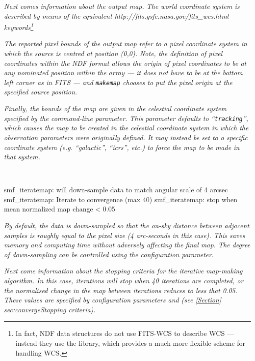 \emph{Next comes information about the output map. The world coordinate
system is described by means of the equivalent 
{http://fits.gsfc.nasa.gov/fits_wcs.html} keywords\footnote{In fact, NDF
data structures do not use FITS-WCS to describe WCS --- instead they use the
 library, which
provides a much more flexible scheme for handling WCS.}}

\emph{The reported pixel bounds of the output map refer to a pixel coordinate
system in which the source is centred at position (0,0). Note, the definition of
pixel coordinates within the NDF format allows the origin of pixel
coordinates to be at any nominated position within the array --- it does
not have to be at the bottom left corner as in FITS --- and \texttt{makemap}
chooses to put the pixel origin at the specified source position. }

\emph{Finally, the bounds of the map are given in the celestial coordinate
system specified by the  command-line
parameter.  This parameter defaults to ``\texttt{tracking}'', which causes
the map to be created in the celestial coordinate system in which the
observation parameters were originally defined. It may instead be set to a
specific coordinate system (e.g. ``galactic'', ``icrs'', etc.) to force the
map to be made in that system.}

~
\begin{terminalv}
smf_iteratemap: will down-sample data to match angular scale of 4 arcsec
smf_iteratemap: Iterate to convergence (max 40)
smf_iteratemap: stop when mean normalized map change < 0.05
\end{terminalv}

\emph{By default, the data is down-sampled so that the on-sky distance between
adjacent samples is roughly equal to the pixel size (4 arc-seconds in
this case). This saves memory and computing time without adversely
affecting the final map. The degree of down-sampling can be controlled
using the  configuration parameter.}

\emph{Next come information about the stopping criteria for the iterative
map-making algorithm. In this case, iterations will stop when 40 iterations are
completed, or the normalised change in the map between iterations reduces
to less that 0.05. These values are specified by configuration parameters
 and  (see \cref{Section}
{sec:converge}{Stopping criteria}).}

